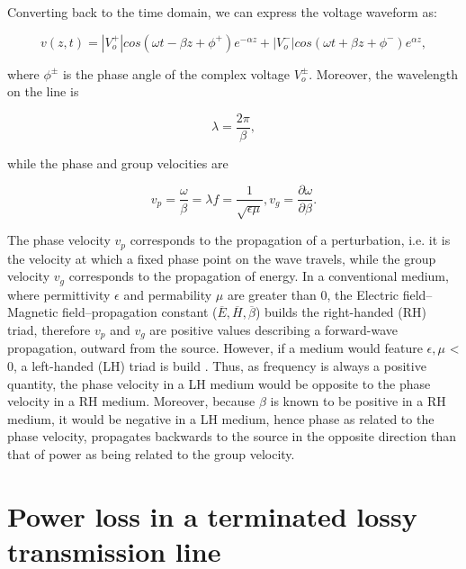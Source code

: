 \indent Converting back to the time domain, we can express the voltage waveform as:

\begin{equation}\label{th:eq11}
v(z,t)=|V_{o}^{+}|cos(\omega t-\beta z +\phi ^{+})e^{-\alpha z}+|V_{o}^{-}|cos(\omega t+\beta z +\phi ^{-})e^{\alpha z},
\end{equation}

\noindent where $\phi ^{\pm }$ is the phase angle of the complex voltage $V_{o}^{\pm }$. Moreover, the wavelength on the line is

\begin{equation}\label{th:eq12}
\lambda = \frac{2\pi }{\beta },
\end{equation}

\noindent while the phase and group velocities are

\begin{subequations}\label{th:eq13}
\begin{equation}\label{th:eq13a}
v_{p} = \frac{\omega }{\beta }=\lambda f=\frac{1}{\sqrt{\epsilon \mu }},
\end{equation}
\begin{equation}\label{th:eq13b}
v_{g} = \frac{\partial \omega }{\partial \beta }.
\end{equation}
\end{subequations}

\indent The phase velocity $v_p$ corresponds to the propagation of a perturbation, i.e. it is the velocity at which a fixed phase point on the wave travels, while the group velocity $v_g$ corresponds to the propagation of energy. In a conventional medium, where permittivity $\epsilon $ and permability $\mu $ are greater than 0, the Electric field–Magnetic field–propagation constant ($\overline{E},\overline{H},\overline{\beta }$) builds the right-handed (RH) triad, therefore $v_p$ and $v_g$ are positive values describing a forward-wave propagation, outward from the source. However, if a medium would feature $\epsilon ,\mu$ < 0, a left-handed (LH) triad is build \cite{caloz}. Thus, as frequency is always a positive quantity, the phase velocity in a LH medium would be opposite to the phase velocity in a RH medium. Moreover, because $\beta $ is known to be positive in a RH medium, it would be negative in a LH medium, hence phase as related to the phase velocity, propagates backwards to the source in the opposite direction than that of power as being related to the group velocity.

\section{Power loss in a terminated lossy transmission line}\label{th:terminated}

